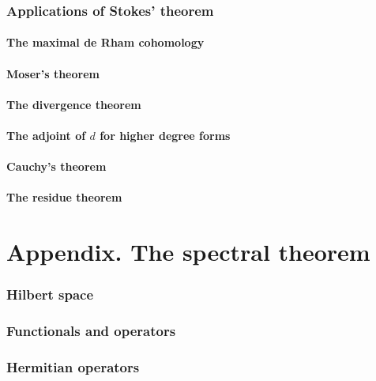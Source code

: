 \documentclass[a4paper]{article}
\begin{document}
\section{Applications of Stokes' theorem}

\subsection{The maximal de Rham cohomology}

\subsection{Moser's theorem}

\subsection{The divergence theorem}

\subsection{The adjoint of $d$ for higher degree forms}

\subsection{Cauchy's theorem}

\subsection{The residue theorem}

\part*{Appendix. The spectral theorem}

\section{Hilbert space}

\section{Functionals and operators}

\section{Hermitian operators}
\end{document}
